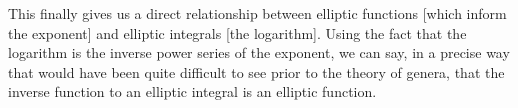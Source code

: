 This finally gives us a direct relationship between elliptic functions [which inform the exponent] and elliptic integrals [the logarithm]. Using the fact that the logarithm is the inverse power series of the exponent, we can say, in a precise way that would have been quite difficult to see prior to the theory of genera, that the inverse function to an elliptic integral is an elliptic function.

